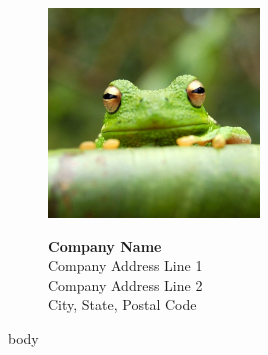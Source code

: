 \documentclass{article}
\begin{document}
\begin{figure}[t]
    \centering
    \begin{minipage}[t]{0.3\textwidth}
        \vspace{0pt} %
        \includegraphics[width=0.5\textwidth]{logo.jpg}
    \end{minipage}
    \hfill
    \begin{minipage}[t]{0.6\textwidth}
        \vspace{0pt} %
        \raggedleft
        {\LARGE\textbf{Company Name}} \\
        \raggedleft
        Company Address Line 1 \\
        Company Address Line 2 \\
        City, State, Postal Code
    \end{minipage}
\end{figure}


{{body}}

\end{document}
